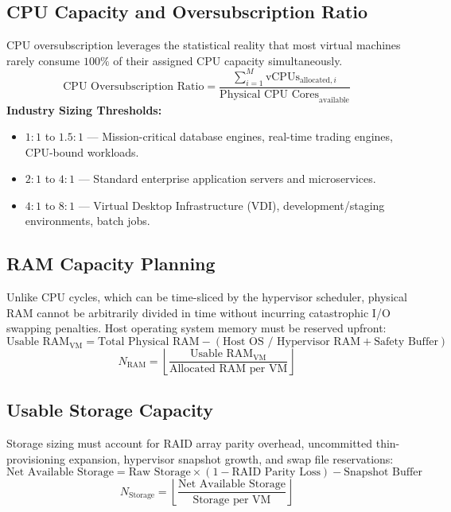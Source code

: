 \subsection{CPU Capacity and Oversubscription Ratio}
CPU oversubscription leverages the statistical reality that most virtual machines rarely consume $100\%$ of their assigned CPU capacity simultaneously.
\begin{equation}
\label{eq:cpu_oversubscription}
\text{CPU Oversubscription Ratio} = \frac{\sum_{i=1}^{M} \text{vCPUs}_{\text{allocated}, i}}{\text{Physical CPU Cores}_{\text{available}}}
\end{equation}
\textbf{Industry Sizing Thresholds:}
\begin{itemize}
    \item $1:1$ to $1.5:1$ --- Mission-critical database engines, real-time trading engines, CPU-bound workloads.
    \item $2:1$ to $4:1$ --- Standard enterprise application servers and microservices.
    \item $4:1$ to $8:1$ --- Virtual Desktop Infrastructure (VDI), development/staging environments, batch jobs.
\end{itemize}

\subsection{RAM Capacity Planning}
Unlike CPU cycles, which can be time-sliced by the hypervisor scheduler, physical RAM cannot be arbitrarily divided in time without incurring catastrophic I/O swapping penalties. Host operating system memory must be reserved upfront:
\begin{equation}
\label{eq:ram_capacity}
\text{Usable RAM}_{\text{VM}} = \text{Total Physical RAM} - (\text{Host OS / Hypervisor RAM} + \text{Safety Buffer})
\end{equation}
\begin{equation}
N_{\text{RAM}} = \left\lfloor \frac{\text{Usable RAM}_{\text{VM}}}{\text{Allocated RAM per VM}} \right\rfloor
\end{equation}

\subsection{Usable Storage Capacity}
Storage sizing must account for RAID array parity overhead, uncommitted thin-provisioning expansion, hypervisor snapshot growth, and swap file reservations:
\begin{equation}
\label{eq:storage_capacity}
\text{Net Available Storage} = \text{Raw Storage} \times (1 - \text{RAID Parity Loss}) - \text{Snapshot Buffer}
\end{equation}
\begin{equation}
N_{\text{Storage}} = \left\lfloor \frac{\text{Net Available Storage}}{\text{Storage per VM}} \right\rfloor
\end{equation}

